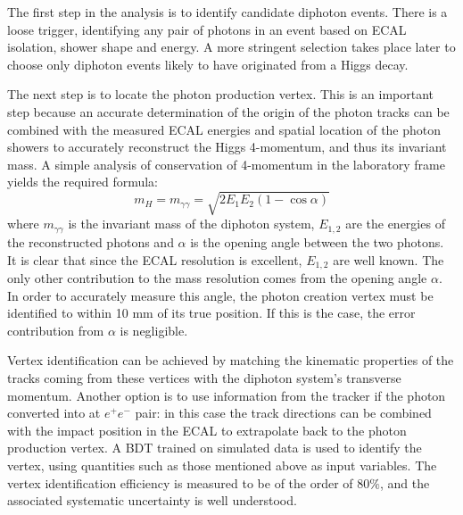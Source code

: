 \documentclass[10pt]{article}
\begin{document}
The first step in the analysis is to identify candidate diphoton events. There is a loose trigger, identifying any pair of photons in an event based on ECAL isolation, shower shape and energy. A more stringent selection takes place later to choose only diphoton events likely to have originated from a Higgs decay.
 
The next step is to locate the photon production vertex. This is an important step because an accurate determination of the origin of the photon tracks can be combined with the measured ECAL energies and spatial location of the photon showers to accurately reconstruct the Higgs 4-momentum, and thus its invariant mass. A simple analysis of conservation of 4-momentum in the laboratory frame yields the required formula:
\begin{equation} m_H=m_{\gamma\gamma}=\sqrt{2E_1 E_2 (1-\cos{\alpha})} \end{equation} where $m_{\gamma\gamma} $ is the invariant mass of the diphoton system, $E_{1,2}$ are the energies of the reconstructed photons and $\alpha$ is the opening angle between the two photons.
It is clear that since the ECAL resolution is excellent, $E_{1,2}$ are well known. The only other contribution to the mass resolution comes from the opening angle $\alpha$. In order to accurately measure this angle, the photon creation vertex must be identified to within 10 mm of its true position. If this is the case, the error contribution from $\alpha$ is negligible.

Vertex identification can be achieved by matching the kinematic properties of the tracks coming from these vertices with the diphoton system's transverse momentum. Another option is to use information from the tracker if the photon converted into at $e^+ e^-$ pair: in this case the track directions can be combined with the impact position in the ECAL to extrapolate back to the photon production vertex. A BDT trained on simulated data is used to identify the vertex, using quantities such as those mentioned above as input variables. The vertex identification efficiency is measured to be of the order of 80$\%$, and the associated systematic uncertainty is well understood. 
\end{document}
